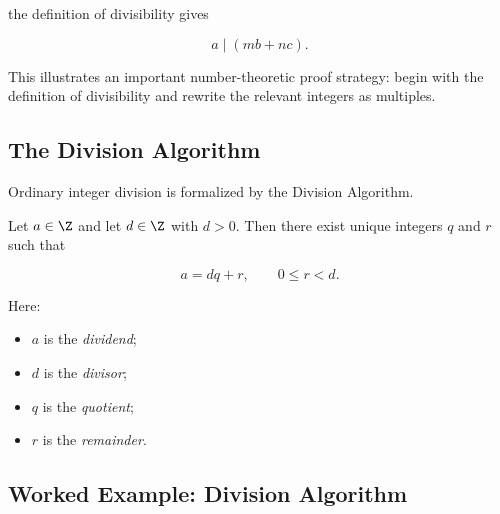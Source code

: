 the definition of divisibility gives

\[ \boxed{a\mid(mb+nc).} \]

This illustrates an important number-theoretic proof strategy: begin with the
definition of divisibility and rewrite the relevant integers as multiples.

\subsection{The Division Algorithm}
\label{subsec:division-algorithm}

Ordinary integer division is formalized by the Division Algorithm.

\begin{theorem}
Let \(a\in\Z\) and let \(d\in\Z\) with \(d>0\). Then there exist unique
integers \(q\) and \(r\) such that

\[ a=dq+r,\qquad 0\leq r<d. \]
\end{theorem}

Here:

\begin{itemize}
    \item \(a\) is the \emph{dividend};
    \item \(d\) is the \emph{divisor};
    \item \(q\) is the \emph{quotient};
    \item \(r\) is the \emph{remainder}.
\end{itemize}

\begin{centereddiagram}
\end{centereddiagram}

\subsection{Worked Example: Division Algorithm}
\label{subsec:worked-division-algorithm}

